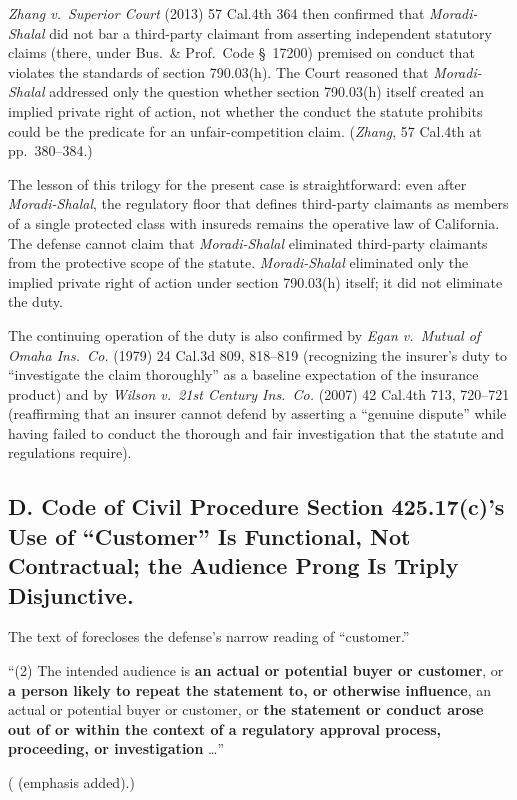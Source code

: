 \textit{Zhang v.\ Superior Court} (2013) 57 Cal.4th 364 then confirmed that \textit{Moradi-Shalal} did not bar a third-party claimant from asserting independent statutory claims (there, under Bus.\ \& Prof.\ Code \S~17200) premised on conduct that violates the standards of section 790.03(h). The Court reasoned that \textit{Moradi-Shalal} addressed only the question whether section 790.03(h) itself created an implied private right of action, not whether the conduct the statute prohibits could be the predicate for an unfair-competition claim. (\textit{Zhang}, 57 Cal.4th at pp.\ 380--384.)

The lesson of this trilogy for the present case is straightforward: even after \textit{Moradi-Shalal}, the regulatory floor that defines third-party claimants as members of a single protected class with insureds remains the operative law of California. The defense cannot claim that \textit{Moradi-Shalal} eliminated third-party claimants from the protective scope of the statute. \textit{Moradi-Shalal} eliminated only the implied private right of action under section 790.03(h) itself; it did not eliminate the duty.

The continuing operation of the duty is also confirmed by \textit{Egan v.\ Mutual of Omaha Ins.\ Co.} (1979) 24 Cal.3d 809, 818--819 (recognizing the insurer's duty to ``investigate the claim thoroughly'' as a baseline expectation of the insurance product) and by \textit{Wilson v.\ 21st Century Ins.\ Co.} (2007) 42 Cal.4th 713, 720--721 (reaffirming that an insurer cannot defend by asserting a ``genuine dispute'' while having failed to conduct the thorough and fair investigation that the statute and regulations require).

\subsection*{D. Code of Civil Procedure Section 425.17(c)'s Use of ``Customer'' Is Functional, Not Contractual; the Audience Prong Is Triply Disjunctive.}

The text of  forecloses the defense's narrow reading of ``customer.''

\begin{quoting}
``(2) The intended audience is \textbf{an actual or potential buyer or customer}, or \textbf{a person likely to repeat the statement to, or otherwise influence}, an actual or potential buyer or customer, or \textbf{the statement or conduct arose out of or within the context of a regulatory approval process, proceeding, or investigation} \dots''
\end{quoting}
\begin{flushright}
\small ( (emphasis added).)
\end{flushright}

